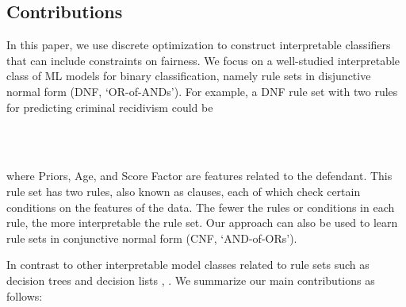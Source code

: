 \documentclass[twoside,11pt]{article}
\begin{document}
\subsection{Contributions}\label{sec:contrib}
In this paper, we use discrete optimization to construct interpretable classifiers that can include constraints on fairness. We focus on a well-studied interpretable class of ML models for binary classification, namely rule sets in disjunctive normal form (DNF, `OR-of-ANDs'). For example, a DNF rule set with two rules for predicting criminal recidivism could be 
\begin{center}
\big[\text{(Priors $\ge$ 3) AND (Age $\le$ 45) AND (Score Factor $=$ TRUE)}\big] \\ 
\\ 
\end{center}

\noindent where Priors, Age, and Score Factor are features related to the defendant. This rule set has two rules, also known as clauses, each of which check certain conditions on the features of the data.
The fewer the rules or conditions in each rule, the more interpretable the rule set.
 Our approach can also be used to learn rule sets in conjunctive normal form (CNF, `AND-of-ORs').
 
In contrast to other interpretable model classes related to rule sets %
such as decision trees \citep{breiman1984, quinlan1993}  and decision lists \citep{rivest1987},  \citep{lakkaraju2016}. We summarize our main contributions as follows:


\end{document}
